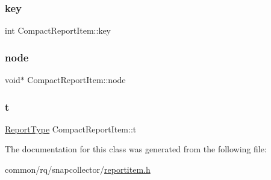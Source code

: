 \mbox{\label{classCompactReportItem_a38caa24aceb0050eec02dd439793df05}} 
\subsubsection{\texorpdfstring{key}{key}}
{\footnotesize\ttfamily int Compact\+Report\+Item\+::key}

\mbox{\label{classCompactReportItem_acedc7035f6c4fd7f2a1c141ee05a6d52}} 
\subsubsection{\texorpdfstring{node}{node}}
{\footnotesize\ttfamily void$\ast$ Compact\+Report\+Item\+::node}

\mbox{\label{classCompactReportItem_a6811374fc37b9b9e9ec44338752d9c76}} 
\subsubsection{\texorpdfstring{t}{t}}
{\footnotesize\ttfamily \hyperlink{reportitem_8h_ae4f179a72db5cca021a37ec4c6fe4c68}{Report\+Type} Compact\+Report\+Item\+::t}



The documentation for this class was generated from the following file\+:\begin{DoxyCompactItemize}
\item 
common/rq/snapcollector/\hyperlink{reportitem_8h}{reportitem.\+h}\end{DoxyCompactItemize}
